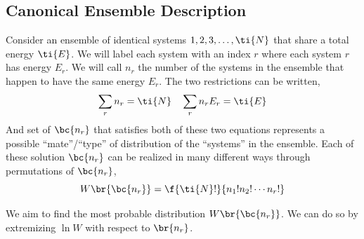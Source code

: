 \documentclass{article}
\begin{document}
\begin{center}
\end{center}

\subsection{Canonical Ensemble Description}

Consider an ensemble of identical systems $1,2,3,\ldots,\ti{N}$ that share a total energy $\ti{E}$. We will label each system with an index $r$ where each system $r$ has energy $E_r$. We will call $n_r$ the number of the systems in the ensemble that happen to have the same energy $E_r$. The two restrictions can be written,
\[ \sum_{r} n_r = \ti{N} \quad \sum_{r} n_r E_r = \ti{E} \]
And set of $\bc{n_r}$ that satisfies both of these two equations represents a possible ``mate''/``type'' of distribution of the ``systems'' in the ensemble. Each of these solution $\bc{n_r}$ can be realized in many different ways through permutations of $\bc{n_r}$,
\[ W\br{\bc{n_r}} = \f{\ti{N}!}{n_1!n_2!\cdots n_r!}\]

We aim to find the most probable distribution $W\br{\bc{n_r}}$. We can do so by extremizing $\ln W$ with respect to $\br{n_r}$.
\end{document}
